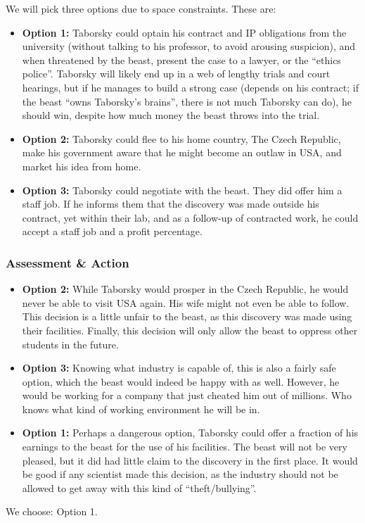 \documentclass[draft,11pt,openright,monochrome,british,a4paper]{scrartcl}
\begin{document}
We will pick three options due to space constraints. These are:
\begin{itemize}
\item \textbf{Option 1:} Taborsky could optain his contract and IP
  obligations from the university (without talking to his professor,
  to avoid arousing suspicion), and when threatened by the beast,
  present the case to a lawyer, or the ``ethics police''. Taborsky
  will likely end up in a web of lengthy trials and court hearings,
  but if he manages to build a strong case (depends on his contract;
  if the beast ``owns Taborsky's brains'', there is not much Taborsky
  can do), he should win, despite how much money the beast throws into
  the trial.

\item \textbf{Option 2:} Taborsky could flee to his home country, The
  Czech Republic, make his government aware that he might become an
  outlaw in USA, and market his idea from home.

\item \textbf{Option 3:} Taborsky could negotiate with the beast. They
  did offer him a staff job. If he informs them that the discovery was
  made outside his contract, yet within their lab, and as a follow-up
  of contracted work, he could accept a staff job and a profit
  percentage.
 \end{itemize}
 
\subsubsection*{Assessment \& Action}
\begin{itemize}
\item \textbf{Option 2:} While Taborsky would prosper in the Czech
  Republic, he would never be able to visit USA again. His wife might
  not even be able to follow. This decision is a little unfair to the
  beast, as this discovery was made using their facilities. Finally,
  this decision will only allow the beast to oppress other students in
  the future.

\item \textbf{Option 3:} Knowing what industry is capable of, this is
  also a fairly safe option, which the beast would indeed be happy
  with as well. However, he would be working for a company that just
  cheated him out of millions. Who knows what kind of working
  environment he will be in.

\item \textbf{Option 1:} Perhaps a dangerous option, Taborsky could
  offer a fraction of his earnings to the beast for the use of his
  facilities. The beast will not be very pleased, but it did had
  little claim to the discovery in the first place. It would be good
  if any scientist made this decision, as the industry should not be
  allowed to get away with this kind of ``theft/bullying''.
 \end{itemize}

We choose: Option 1.

\enlargethispage{30px}
\small


\end{document}
